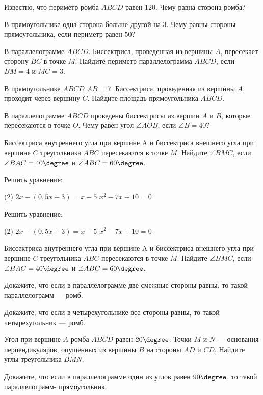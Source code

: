 %
%
\begin{class}[number=1]
	\begin{listofex}
		\item Известно, что периметр ромба \( ABCD \) равен \( 120 \). Чему равна сторона ромба?
		\item В прямоугольнике одна сторона больше другой на \( 3 \). Чему равны стороны прямоугольника, если периметр равен \( 50 \)?
		\item В параллелограмме \( ABCD \). Биссектриса, проведенная из вершины \( A \), пересекает сторону \( BC \) в точке \( M \). Найдите периметр параллелограмма \( ABCD \), если \( BM=4 \) и \( MC=3 \).
		\item В прямоугольнике \( ABCD \) \( AB=7 \). Биссектриса, проведенная из вершины \( A \), проходит через вершину \( C \). Найдите площадь прямоугольника \( ABCD \).
		\item В параллелограмме \( ABCD \) проведены биссектрисы из вершин \( A \) и \( B \), которые пересекаются в точке \( O \). Чему равен угол \( \angle AOB \), если \( \angle B= 40 \)?
		\item Биссектриса внутреннего угла при вершине A и
		биссектриса внешнего угла при вершине \( C \) треугольника \( ABC \)
		пересекаются в точке \( M \). Найдите \( \angle BMC \), если \( \angle BAC = 40\degree \) и \( \angle ABC = 60\degree \).
		\item Решить уравнение:
		\begin{tasks}(2)
			\task \( 2x-(0,5x+3)=x-5 \)
			\task \( x^2-7x+10=0 \)
		\end{tasks}
	\end{listofex}
\end{class}
\begin{class}[number=2]
	\begin{listofex}
			\item Решить уравнение:
		\begin{tasks}(2)
			\task \( 2x-(0,5x+3)=x-5 \)
			\task \( x^2-7x+10=0 \)
		\end{tasks}
		\item Биссектриса внутреннего угла при вершине A и биссектриса внешнего угла при вершине \( C \) треугольника \( ABC \)
		пересекаются в точке \( M \). Найдите \( \angle BMC \), если \( \angle BAC = 40\degree \) и \( \angle ABC = 60\degree \).
		\item Докажите, что если в параллелограмме две смежные стороны равны, то такой параллелограмм --- ромб.
		\item Докажите, что если в четырехугольнике все стороны равны, то такой четырехугольник --- ромб.
		\item Угол при вершине \( A \) ромба \( ABCD \) равен \( 20\degree \). Точки \( M \) и \( N \) --- основания перпендикуляров, опущенных из вершины \( B \) на стороны \( AD \) и \( CD \). Найдите углы треугольника \( BMN \).
		\item Докажите, что если в параллелограмме один из углов равен \( 90\degree \), то такой параллелограмм- прямоугольник.
	\end{listofex}
\end{class}

